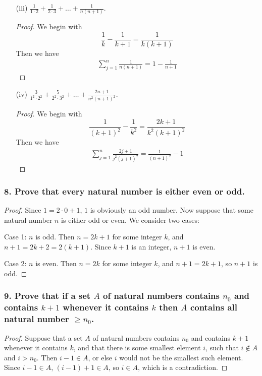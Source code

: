 \documentclass{article}
\begin{document}
\begin{enumerate}
\begin{proof}
\begin{align*}
		\end{align*}
	\end{proof}
	\item[(iii)] $\frac{1}{1 \cdot 2} + \frac{1}{2 \cdot 3} + \dots + \frac{1}{n(n + 1)}$.
	\begin{proof}
		We begin with \[ \frac{1}{k} - \frac{1}{k + 1} = \frac{1}{k(k+1)} \] Then we have
		\begin{align*}
			\sum_{j=1}^{n}\frac{1}{n(n + 1)} = 1 - \frac{1}{n + 1}
		\end{align*}
	\end{proof}
	\item[(iv)] $\frac{3}{1^2 \cdot 2^2} + \frac{5}{2^2 \cdot 3^2} + \dots + \frac{2n + 1}{n^2(n + 1)^2}$.
	\begin{proof}
		We begin with \[ \frac{1}{(k+1)^2} - \frac{1}{k^2} = \frac{2k+1}{k^2(k+1)^2} \] Then we have
		\begin{align*}
			\sum_{j=1}^{n}\frac{2j+1}{j^2(j+1)^2} = \frac{1}{(n + 1)^2} - 1
		\end{align*}
	\end{proof}
\end{enumerate}

\subsubsection*{8. Prove that every natural number is either even or odd.}
\begin{proof}
	Since $1 = 2 \cdot 0 + 1$, $1$ is obviously an odd number. Now suppose that some natural number $n$ is either odd or even. We consider two cases:

	Case 1: $n$ is odd. Then $n = 2k + 1$ for some integer $k$, and $n+1 = 2k + 2 = 2(k + 1)$. Since $k + 1$ is an integer, $n + 1$ is even.

	Case 2: $n$ is even. Then $n = 2k$ for some integer $k$, and $n + 1 = 2k + 1$, so $n + 1$ is odd.
\end{proof}

\subsubsection*{9. Prove that if a set $A$ of natural numbers contains $n_0$ and contains $k + 1$ whenever it contains $k$ then $A$ contains all natural number $\ge n_0$.}
\begin{proof}
	Suppose that a set $A$ of natural numbers contains $n_0$ and contains $k + 1$ whenever it contains $k$, and that there is some smallest element $i$, such that $i \notin A$ and $i > n_0$. Then $i - 1 \in A$, or else $i$ would not be the smallest such element. Since $i - 1 \in A$, $(i - 1) + 1 \in A$, so $i \in A$, which is a contradiction.
\end{proof}
\end{document}
